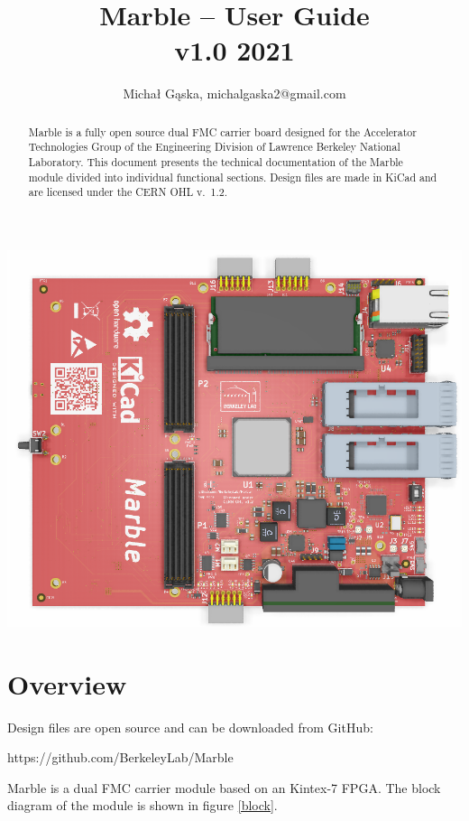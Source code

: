 \documentclass[12pt,oneside,a4]{article}
\title{Marble -- User Guide\\ \small{v1.0 2021}}
\author{Michał Gąska, michalgaska2@gmail.com}
\begin{document}
\maketitle
\begin{center}
\includegraphics[width=0.8\linewidth]{marble_top.png}
\end{center}
\begin{abstract}
Marble is a fully open source dual FMC carrier board designed for the Accelerator Technologies Group of the Engineering Division of Lawrence Berkeley National Laboratory. This document presents the technical documentation of the Marble module divided into individual functional sections.
Design files are made in KiCad and are licensed under the CERN OHL v.~1.2.
\end{abstract}

\clearpage
\tableofcontents

\clearpage

\section{Overview}

\begin{leftbar}
Design files are open source and can be downloaded from GitHub:

https://github.com/BerkeleyLab/Marble
\end{leftbar}

Marble is a dual FMC carrier module based on an Kintex-7 FPGA. The block diagram of the module is shown in figure \ref{block}.
\end{document}
